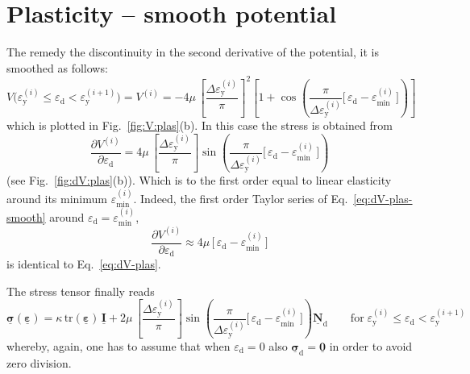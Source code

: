 \documentclass[times,namecite]{goose-article}
\newcommand\T[1]{\underline{\bm{{#1}}}}
\begin{document}
\section{Plasticity -- smooth potential}

The remedy the discontinuity in the second derivative of the potential, it is smoothed as follows:
\begin{equation}\label{eq:V-plas-smooth}
  V \big(
    \varepsilon_\mathrm{y}^{(i)} \leq \varepsilon_\mathrm{d} < \varepsilon_\mathrm{y}^{(i+1)}
  \big)
  =
  V^{(i)}
  =
  - 4 \mu \,
  \left[ \frac{\Delta \varepsilon_\mathrm{y}^{(i)}}{\pi} \right]^2
  \left[
    1
    +
    \cos \left(
      \frac{ \pi }{ \Delta \varepsilon_\mathrm{y}^{(i)} }
      \Big[\, \varepsilon_\mathrm{d} - \varepsilon_\mathrm{min}^{(i)} \,\Big]
    \right)
  \right]
\end{equation}
which is plotted in Fig.~\ref{fig:V:plas}(b). In this case the stress is obtained from
\begin{equation}\label{eq:dV-plas-smooth}
  \frac{\partial V^{(i)}}{\partial \varepsilon_\mathrm{d}}
  =
  4 \mu \,
  \left[ \frac{\Delta \varepsilon_\mathrm{y}^{(i)}}{\pi} \right]
  \sin \left(
    \frac{ \pi }{ \Delta \varepsilon_\mathrm{y}^{(i)} }
    \Big[\, \varepsilon_\mathrm{d} - \varepsilon_\mathrm{min}^{(i)} \,\Big]
  \right)
\end{equation}
(see Fig.~\ref{fig:dV:plas}(b)). Which is to the first order equal to linear elasticity around its minimum $\varepsilon_\mathrm{min}^{(i)}$. Indeed, the first order Taylor series of Eq.~\eqref{eq:dV-plas-smooth} around $\varepsilon_\mathrm{d} = \varepsilon_\mathrm{min}^{(i)}$,
\begin{equation}
  \frac{\partial V^{(i)}}{\partial \varepsilon_\mathrm{d}}
  \approx
  4 \mu \, \Big[\, \varepsilon_\mathrm{d} - \varepsilon_\mathrm{min}^{(i)} \,\Big]
\end{equation}
is identical to Eq.~\eqref{eq:dV-plas}.

The stress tensor finally reads
\begin{equation}
  \T{\sigma} ( \T{\varepsilon} )
  =
  \kappa \, \mathrm{tr} ( \T{\varepsilon} ) \, \T{I}
  +
  2 \mu \,
  \left[ \frac{\Delta \varepsilon_\mathrm{y}^{(i)}}{\pi} \right]
  \sin \left(
    \frac{ \pi }{ \Delta \varepsilon_\mathrm{y}^{(i)} }
    \Big[\, \varepsilon_\mathrm{d} - \varepsilon_\mathrm{min}^{(i)} \,\Big]
  \right)
  \T{N}_\mathrm{d}
  \qquad
  \mathrm{for}
  \;
  \varepsilon_\mathrm{y}^{(i)} \leq \varepsilon_\mathrm{d} < \varepsilon_\mathrm{y}^{(i+1)}
\end{equation}
whereby, again, one has to assume that when $\varepsilon_\mathrm{d} = 0$ also $\T{\sigma}_\mathrm{d} = \T{0}$ in order to avoid zero division.
\end{document}
